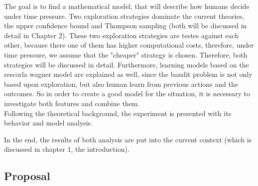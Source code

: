 The goal is to find a mathematical model, that will describe how humans decide under time pressure. %
Two exploration strategies dominate the current theories, the upper confidence bound and Thompson sampling (both will be discussed in detail in Chapter 2). %
These two exploration strategies are testes against each other, because there one of them has higher computational costs, therefore, under time pressure, we assume that the "cheaper" strategy is chosen. Therefore, both strategies will be discussed in detail. 
Furthermore, learning models based on the rescorla wagner model are explained as well, since the bandit problem is not only based upon exploration, but also human learn from previous actions and the outcomes. So in order to create a good model for the situation, it is necessary to investigate both features and combine them. 
\\
Following the theoretical background, the experiment is presented with its behavior and model analysis. 

In the end, the results of both analysis are put into the current context (which is discussed in chapter 1, the introduction). 


\subsection{Proposal}






